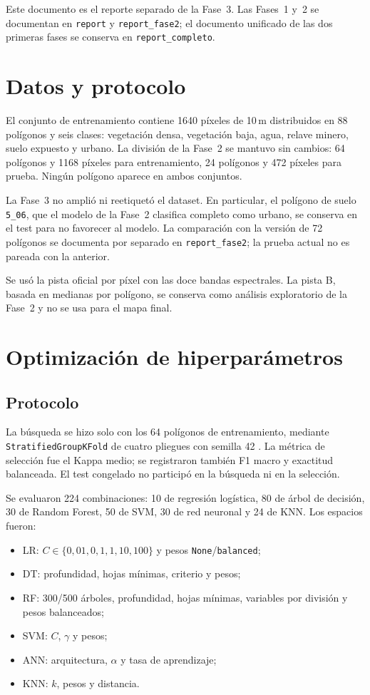 \documentclass{article}
\begin{document}
Este documento es el reporte separado de la Fase~3. Las Fases~1 y~2 se documentan en \texttt{report} y \texttt{report\_fase2}; el documento unificado de las dos primeras fases se conserva en \texttt{report\_completo}.

\section{Datos y protocolo}

El conjunto de entrenamiento contiene 1640 píxeles de 10\,m distribuidos en 88 polígonos y seis clases: vegetación densa, vegetación baja, agua, relave minero, suelo expuesto y urbano. La división de la Fase~2 se mantuvo sin cambios: 64 polígonos y 1168 píxeles para entrenamiento, 24 polígonos y 472 píxeles para prueba. Ningún polígono aparece en ambos conjuntos.

La Fase~3 no amplió ni reetiquetó el dataset. En particular, el polígono de suelo \texttt{5\_06}, que el modelo de la Fase~2 clasifica completo como urbano, se conserva en el test para no favorecer al modelo. La comparación con la versión de 72 polígonos se documenta por separado en \texttt{report\_fase2}; la prueba actual no es pareada con la anterior.

Se usó la pista oficial por píxel con las doce bandas espectrales. La pista B, basada en medianas por polígono, se conserva como análisis exploratorio de la Fase~2 y no se usa para el mapa final.

\section{Optimización de hiperparámetros}

\subsection{Protocolo}

La búsqueda se hizo solo con los 64 polígonos de entrenamiento, mediante \texttt{StratifiedGroupKFold} de cuatro pliegues con semilla 42 \parencite{Roberts2017}. La métrica de selección fue el Kappa medio; se registraron también F1 macro y exactitud balanceada. El test congelado no participó en la búsqueda ni en la selección.

Se evaluaron 224 combinaciones: 10 de regresión logística, 80 de árbol de decisión, 30 de Random Forest, 50 de SVM, 30 de red neuronal y 24 de KNN. Los espacios fueron:

\begin{itemize}
 \item LR: $C \in \{0{,}01, 0{,}1, 1, 10, 100\}$ y pesos \texttt{None}/\texttt{balanced};
 \item DT: profundidad, hojas mínimas, criterio y pesos;
 \item RF: 300/500 árboles, profundidad, hojas mínimas, variables por división y pesos balanceados;
 \item SVM: $C$, $\gamma$ y pesos;
 \item ANN: arquitectura, $\alpha$ y tasa de aprendizaje;
 \item KNN: $k$, pesos y distancia.
\end{itemize}
\end{document}
